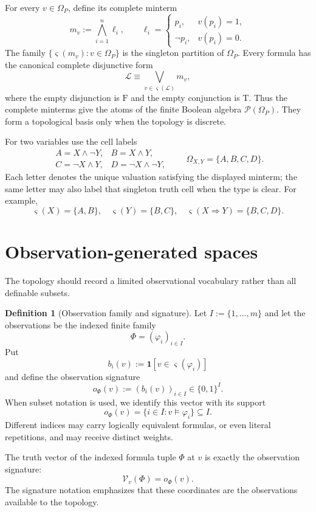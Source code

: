 \documentclass[11pt]{article}
\theoremstyle{definition}
\newtheorem{definition}{Definition}[section]
\theoremstyle{plain}
\theoremstyle{remark}
\newcommand{\True}{\mathrm{T}}
\newcommand{\False}{\mathrm{F}}
\newcommand{\Pow}{\mathcal P}
\newcommand{\ind}{\mathbf 1}
\newcommand{\modelsF}{\models}
\begin{document}
For every $v\in\Omega_P$, define its complete minterm
\[
  m_v:=\bigwedge_{i=1}^n \ell_i,
  \qquad
  \ell_i=
  \begin{cases}
    p_i,&v(p_i)=1,\\
    \neg p_i,&v(p_i)=0.
  \end{cases}
\]
The family $\{\varsigma(m_v):v\in\Omega_P\}$ is the singleton partition of
$\Omega_P$.  Every formula has the canonical complete disjunctive form
\[
  \mathcal L\equiv
  \bigvee_{v\in\varsigma(\mathcal L)}m_v,
\]
where the empty disjunction is $\False$ and the empty conjunction is $\True$.
Thus the complete minterms give the atoms of the finite Boolean algebra
$\Pow(\Omega_P)$.  They form a topological basis only when the topology is
discrete.

For two variables use the cell labels
\[
\begin{array}{ll}
 A=X\wedge\neg Y, & B=X\wedge Y,\\
 C=\neg X\wedge Y, & D=\neg X\wedge\neg Y,
\end{array}
\qquad
\Omega_{X,Y}=\{A,B,C,D\}.
\]
Each letter denotes the unique valuation satisfying the displayed minterm; the
same letter may also label that singleton truth cell when the type is clear.
For example,
\[
 \varsigma(X)=\{A,B\},\quad
 \varsigma(Y)=\{B,C\},\quad
 \varsigma(X\Rightarrow Y)=\{B,C,D\}.
\]

\section{Observation-generated spaces}

The topology should record a limited observational vocabulary rather than all
definable subsets.

\begin{definition}[Observation family and signature]
Let $I:=\{1,\ldots,m\}$ and let the observations be the indexed finite family
\[
  \Phi=(\varphi_i)_{i\in I}.
\]
Put
\[
  b_i(v):=\ind[v\in\varsigma(\varphi_i)]
\]
and define the observation signature
\[
  o_\Phi(v):=(b_i(v))_{i\in I}\in\{0,1\}^I.
\]
When subset notation is used, we identify this vector with its support
\[
  o_\Phi(v)=\{i\in I:v\modelsF\varphi_i\}\subseteq I.
\]
Different indices may carry logically equivalent formulas, or even literal
repetitions, and may receive distinct weights.
\end{definition}

The truth vector of the indexed formula tuple $\Phi$ at $v$ is
exactly the observation signature:
\[
 \mathcal V_v(\Phi)=o_\Phi(v).
\]
The signature notation emphasizes that these coordinates are the observations
available to the topology.
\end{document}
